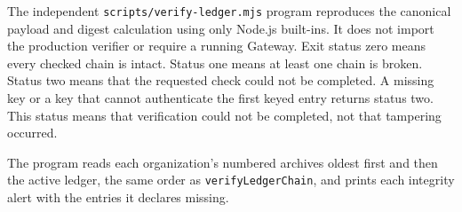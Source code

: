 The independent \texttt{scripts/verify-ledger.mjs} program reproduces the canonical payload and digest calculation using only Node.js built-ins. It does not import the production verifier or require a running Gateway. Exit status zero means every checked chain is intact. Status one means at least one chain is broken. Status two means that the requested check could not be completed. A missing key or a key that cannot authenticate the first keyed entry
returns status two. This status means that verification could not be
completed, not that tampering occurred.

{\color{red}The program reads each organization's numbered archives oldest first
and then the active ledger, the same order as \texttt{verifyLedgerChain}, and
prints each integrity alert with the entries it declares missing.}

\FloatBarrier

